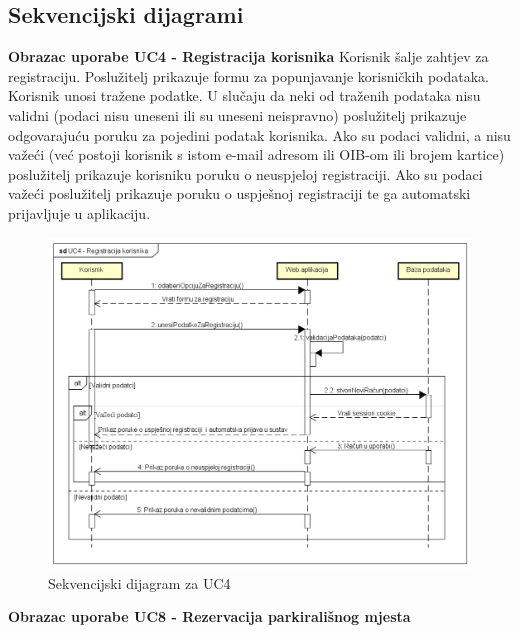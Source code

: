 \subsection{Sekvencijski dijagrami}

\textbf{Obrazac uporabe UC4 - Registracija korisnika}\newline
Korisnik šalje zahtjev za registraciju. Poslužitelj prikazuje formu za popunjavanje korisničkih podataka. Korisnik unosi tražene podatke. U slučaju da neki od traženih podataka nisu validni (podaci nisu uneseni ili su uneseni neispravno) poslužitelj prikazuje odgovarajuću poruku za pojedini podatak korisnika. Ako su podaci validni, a nisu važeći (već postoji korisnik s istom e-mail adresom ili OIB-om ili brojem kartice) poslužitelj prikazuje korisniku poruku o neuspjeloj registraciji. Ako su podaci važeći poslužitelj prikazuje poruku o uspješnoj registraciji te ga automatski prijavljuje u aplikaciju.\newline
\begin{figure}[H]
	\includegraphics[width=1\linewidth]{dijagrami/UC4 - Registracija korisnika.png} %
	\caption{Sekvencijski dijagram za UC4}
	\label{fig:promjene2} %
\end{figure}
\pagebreak
\textbf{Obrazac uporabe UC8 - Rezervacija parkirališnog mjesta}\newline
